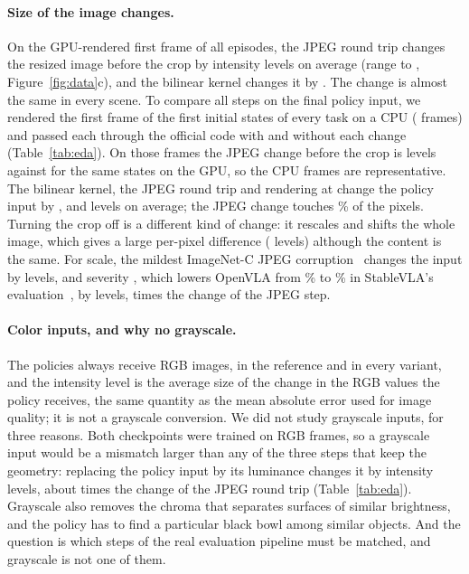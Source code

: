 \paragraph{Size of the image changes.} On the GPU-rendered first frame of all \NPairs{} episodes, the JPEG round trip changes the resized image before the crop by \GpuMadMean{} intensity levels on average (range \GpuMadMin{} to \GpuMadMax, Figure~\ref{fig:data}c), and the bilinear kernel changes it by \GpuBilMean. The change is almost the same in every scene. To compare all steps on the final policy input, we rendered the first frame of the first \EdaStates{} initial states of every task on a CPU (\EdaFrames{} frames) and passed each through the official code with and without each change (Table~\ref{tab:eda}). On those frames the JPEG change before the crop is \CpuPreMean{} levels against \GpuSameMean{} for the same states on the GPU, so the CPU frames are representative. The bilinear kernel, the JPEG round trip and rendering at \InputRes{} change the policy input by \EdaBil, \EdaJpeg{} and \EdaRend{} levels on average; the JPEG change touches \EdaJpegChanged\% of the pixels. Turning the crop off is a different kind of change: it rescales and shifts the whole image, which gives a large per-pixel difference (\EdaCrop{} levels) although the content is the same. For scale, the mildest ImageNet-C JPEG corruption~\citep{imagenetc} changes the input by \EdaCone{} levels, and severity \ExtStableSevLo, which lowers OpenVLA from \ExtStableClean\% to \ExtStableJpegThree\% in StableVLA's evaluation~\citep{stablevla}, by \EdaCthree{} levels, \EdaCthreeRatio{} times the change of the JPEG step.



\paragraph{Color inputs, and why no grayscale.} The policies always receive RGB images, in the reference and in every variant, and the intensity level is the average size of the change in the RGB values the policy receives, the same quantity as the mean absolute error used for image quality; it is not a grayscale conversion. We did not study grayscale inputs, for three reasons. Both checkpoints were trained on RGB frames, so a grayscale input would be a mismatch larger than any of the three steps that keep the geometry: replacing the policy input by its luminance changes it by \EdaGray{} intensity levels, about \EdaGrayRatio{} times the change of the JPEG round trip (Table~\ref{tab:eda}). Grayscale also removes the chroma that separates surfaces of similar brightness, and the policy has to find a particular black bowl among similar objects. And the question is which steps of the real evaluation pipeline must be matched, and grayscale is not one of them.

